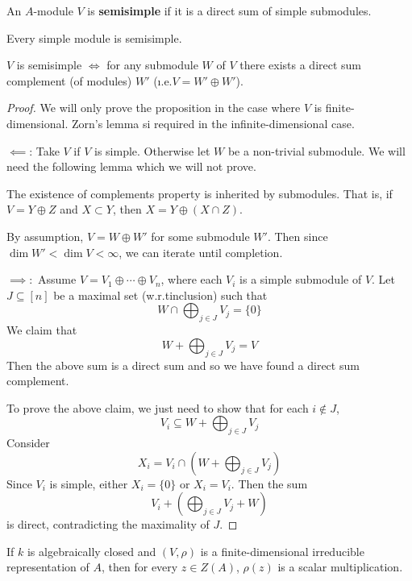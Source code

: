 \begin{defn}
	An $A$-module $V$ is \textbf{semisimple} if it is a direct sum of simple submodules.
\end{defn}

\begin{rmk}
	Every simple module is semisimple.
\end{rmk}

\begin{prop}
	$V$ is semisimple $\iff$ for any submodule $W$ of $V$ there exists a direct sum complement (of modules) $W'$ (\i.e.\@ $V = W' \oplus W'$).
\end{prop}

\begin{proof}
	We will only prove the proposition in the case where $V$ is finite-dimensional.
	Zorn's lemma si required in the infinite-dimensional case.
	
	$\impliedby$: Take $V$ if $V$ is simple.
	Otherwise let $W$ be a non-trivial submodule.
	We will need the following lemma which we will not prove.
	\begin{lem}
		The existence of complements property is inherited by submodules.
		That is, if $V = Y \oplus Z$ and $X \subset Y$, then $X = Y \oplus (X \cap Z)$.
	\end{lem}	
	By assumption, $V = W \oplus W'$ for some submodule $W'$.
	Then since $\dim W' < \dim V < \infty$, we can iterate until completion.
	
	$\implies:$
	Assume $V = V_1 \oplus \cdots \oplus V_n$, where each $V_i$ is a simple submodule of $V$.
	Let $J \subseteq [n]$ be a maximal set (w.r.t\@ inclusion) such that
	\[W \cap \bigoplus_{j \in J} V_j = \{0\}\]
	We claim that 
	\[W + \bigoplus_{j \in J} V_j = V\]
	Then the above sum is a direct sum and so we have found a direct sum complement.
	
	To prove the above claim, we just need to show that for each $i \notin J$,
	\[V_i \subseteq W + \bigoplus_{j \in J} V_j\]
	Consider
	\[X_i = V_i \cap \left( W + \bigoplus_{j \in J} V_j \right)\]
	Since $V_i$ is simple, either $X_i = \{0\}$ or $X_i = V_i$.
	Then the sum
	\[V_i + \left( \bigoplus_{j \in J} V_j + W \right)\]
	is direct, contradicting the maximality of $J$.
\end{proof}

\begin{cor}\label{cor:schur}
	If $k$ is algebraically closed and $(V,\rho)$ is a finite-dimensional irreducible representation of $A$, then for every $z \in Z(A)$, $\rho(z)$ is a scalar multiplication.
\end{cor}


